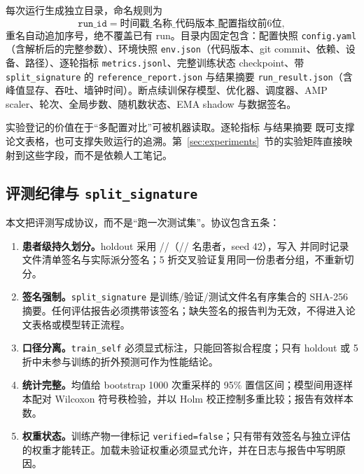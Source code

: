 每次运行生成独立目录，命名规则为
\begin{equation}
\texttt{run\_id}=\text{时间戳}\_\text{名称}\_\text{代码版本}\_\text{配置指纹前6位},
\end{equation}
重名自动追加序号，绝不覆盖已有 run。目录内固定包含：配置快照 \texttt{config.yaml}（含解析后的完整参数）、环境快照 \texttt{env.json}（代码版本、git commit、依赖、设备、路径）、逐轮指标 \texttt{metrics.jsonl}、完整训练状态 checkpoint、带 \texttt{split\_signature} 的 \texttt{reference\_report.json} 与结果摘要 \texttt{run\_result.json}（含峰值显存、吞吐、墙钟时间）。断点续训保存模型、优化器、调度器、AMP scaler、轮次、全局步数、随机数状态、EMA shadow 与数据签名。

实验登记的价值在于“多配置对比”可被机器读取。逐轮指标  与结果摘要  既可支撑论文表格，也可支撑失败运行的追溯。第~\ref{sec:experiments}~节的实验矩阵直接映射到这些字段，而不是依赖人工笔记。



\subsection{评测纪律与 \texttt{split\_signature}}\label{sec:discipline}

本文把评测写成协议，而不是“跑一次测试集”。协议包含五条：

\begin{enumerate}[label=\textbf{E\arabic*.}]
\item \textbf{患者级持久划分。}holdout 采用 \nTrain/\nVal/\nTest（\nTrainPatients/\nValPatients/\nTestPatients{} 名患者，seed 42），写入  并同时记录文件清单签名与实际派分签名；5 折交叉验证复用同一份患者分组，不重新切分。
\item \textbf{签名强制。}\texttt{split\_signature} 是训练/验证/测试文件名有序集合的 SHA-256 摘要。任何评估报告必须携带该签名；缺失签名的报告判为无效，不得进入论文表格或模型转正流程。
\item \textbf{口径分离。}\texttt{train\_self} 必须显式标注，只能回答拟合程度；只有 holdout 或 5 折中未参与训练的折外预测可作为性能结论。
\item \textbf{统计完整。}均值给 bootstrap 1000 次重采样的 95\% 置信区间；模型间用逐样本配对 Wilcoxon 符号秩检验，并以 Holm 校正控制多重比较；报告有效样本数。
\item \textbf{权重状态。}训练产物一律标记 \texttt{verified=false}；只有带有效签名与独立评估的权重才能转正。加载未验证权重必须显式允许，并在日志与报告中写明原因。
\end{enumerate}


